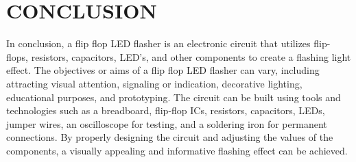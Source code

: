 \documentclass{article}
\begin{document}
\section{CONCLUSION}
                          
In conclusion, a flip flop LED flasher is an electronic circuit that utilizes flip-flops, resistors, capacitors, LED's, and other components to create a flashing light effect. The objectives or aims of a flip flop LED flasher can vary, including attracting visual attention, signaling or indication, decorative lighting, educational purposes, and prototyping. The circuit can be built using tools and technologies such as a breadboard, flip-flop ICs, resistors, capacitors, LEDs, jumper wires, an oscilloscope for testing, and a soldering iron for permanent connections. By properly designing the circuit and adjusting the values of the components, a visually appealing and informative flashing effect can be achieved.
\end{document}
